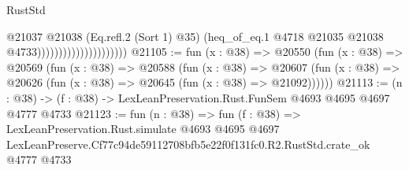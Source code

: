 \begin{lexlean}{RustStd}
\begin{coremodule}
                                          @21037
                                            @21038
                                            (Eq.refl.{2} (Sort 1) @35)
                                            (heq_of_eq.{1}
                                              @4718
                                              @21035
                                              @21038
                                              @4733)))))))))))))))))))))
@21105 := fun (x : @38) =>
  @20550
    (fun (x : @38) =>
    @20569
      (fun (x : @38) =>
      @20588
        (fun (x : @38) =>
        @20607 (fun (x : @38) => @20626 (fun (x : @38) => @20645 (fun (x : @38) => @21092))))))
@21113 := (n : @38) -> (f : @38) -> LexLeanPreservation.Rust.FunSem @4693 @4695 @4697 @4777 @4733
@21123 := fun (n : @38) =>
  fun (f : @38) =>
  LexLeanPreservation.Rust.simulate
    @4693
    @4695
    @4697
    LexLeanPreserve.Cf77c94de59112708bfb5e22f0f131fc0.R2.RustStd.crate_ok
    @4777
    @4733
\end{coremodule}
\end{lexlean}
